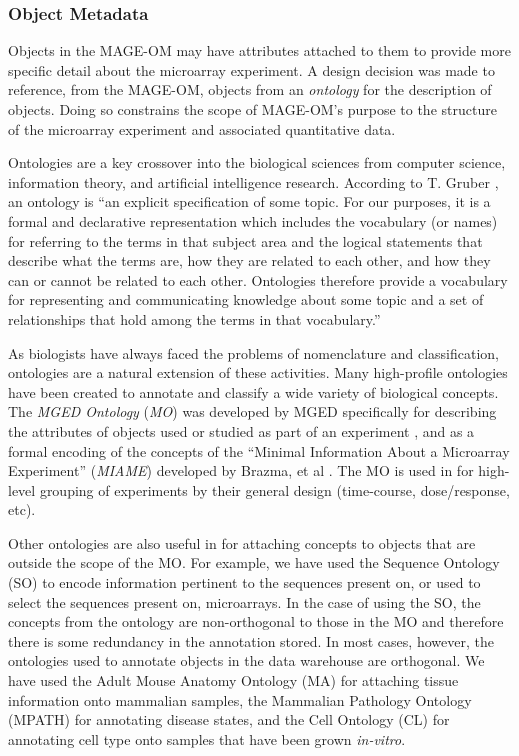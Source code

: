 \subsubsection{Object Metadata}
\label{Object Metadata}

Objects in the MAGE-OM may have attributes attached to them to provide
more specific detail about the microarray experiment.  A design decision was
made to reference, from the MAGE-OM, objects from an \emph{ontology} for the
description of objects.  Doing so constrains the scope of MAGE-OM's purpose to
the structure of the microarray experiment and associated quantitative data.

Ontologies are a key crossover into the biological sciences from computer
science, information theory, and artificial intelligence research.  According
to T. Gruber \cite{XXX}, an ontology is ``an explicit specification of some
topic. For our purposes, it is a formal and declarative representation which
includes the vocabulary (or names) for referring to the terms in that subject
area and the logical statements that describe what the terms are, how they are
related to each other, and how they can or cannot be related to each other.
Ontologies therefore provide a vocabulary for representing and communicating
knowledge about some topic and a set of relationships that hold among the terms
in that vocabulary.''

As biologists have always faced the problems of nomenclature and
classification, ontologies are a natural extension of these activities.  Many
high-profile ontologies have been created to annotate and classify a wide
variety of biological concepts.  The \emph{MGED Ontology} (\emph{MO}) was
developed by MGED specifically for describing the attributes of objects used or
studied as part of an experiment \cite{XXX}, and as a formal encoding of the
concepts of the ``Minimal Information About a Microarray Experiment''
(\emph{MIAME}) developed by Brazma, et al \cite{miame}.  The MO is used
in \dbthesis for high-level grouping of experiments by their general design
(time-course, dose/response, etc).

Other ontologies are also useful in \dbthesis for attaching concepts to objects
that are outside the scope of the MO.  For example, we have used the Sequence
Ontology (SO) \cite{so} to encode information pertinent to the sequences
present on, or used to select the sequences present on, microarrays.  In
the case of using the SO, the concepts from the ontology are non-orthogonal to
those in the MO and therefore there is some redundancy in the annotation
stored.  In most cases, however, the ontologies used to annotate objects in the
data warehouse are orthogonal.  We have used the Adult Mouse Anatomy Ontology
(MA) \cite{ma} for attaching tissue information onto mammalian samples, the
Mammalian Pathology Ontology (MPATH) \cite{mpath} for annotating disease
states, and the Cell Ontology (CL) \cite{cl} for annotating cell type onto
samples that have been grown \emph{in-vitro}.

